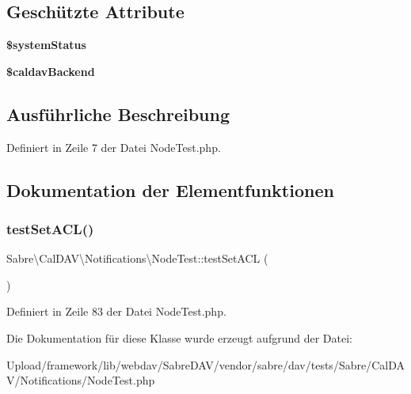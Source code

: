 \subsection*{Geschützte Attribute}
\begin{DoxyCompactItemize}
\item 
\mbox{\label{class_sabre_1_1_cal_d_a_v_1_1_notifications_1_1_node_test_a001e0c9cd18ae8016331dc8acf1799e8}} 
{\bfseries \$system\+Status}
\item 
\mbox{\label{class_sabre_1_1_cal_d_a_v_1_1_notifications_1_1_node_test_a332963fd6710b930506bae31e552e7af}} 
{\bfseries \$caldav\+Backend}
\end{DoxyCompactItemize}


\subsection{Ausführliche Beschreibung}


Definiert in Zeile 7 der Datei Node\+Test.\+php.



\subsection{Dokumentation der Elementfunktionen}
\mbox{\label{class_sabre_1_1_cal_d_a_v_1_1_notifications_1_1_node_test_a0e5ebfdc6f07dfe00acf2baf8fdb8d39}} 
\subsubsection{\texorpdfstring{test\+Set\+A\+C\+L()}{testSetACL()}}
{\footnotesize\ttfamily Sabre\textbackslash{}\+Cal\+D\+A\+V\textbackslash{}\+Notifications\textbackslash{}\+Node\+Test\+::test\+Set\+A\+CL (\begin{DoxyParamCaption}{ }\end{DoxyParamCaption})}



Definiert in Zeile 83 der Datei Node\+Test.\+php.



Die Dokumentation für diese Klasse wurde erzeugt aufgrund der Datei\+:\begin{DoxyCompactItemize}
\item 
Upload/framework/lib/webdav/\+Sabre\+D\+A\+V/vendor/sabre/dav/tests/\+Sabre/\+Cal\+D\+A\+V/\+Notifications/Node\+Test.\+php\end{DoxyCompactItemize}
